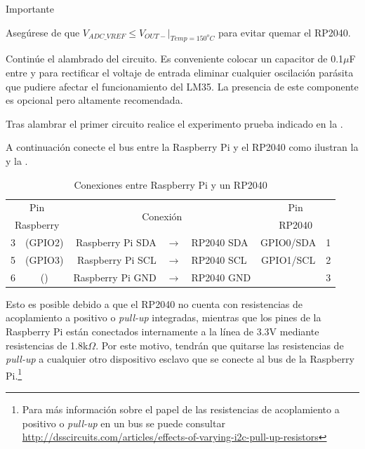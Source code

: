 \medskip
\begin{importantbox}{\large Importante}
	\begin{center}
		Asegúrese de que $V_{ADC\_VREF} \leq V_{OUT-}\Big|_{Temp=150^{o}C}$ para evitar quemar el RP2040.
	\end{center}
\end{importantbox}
\medskip

Continúe el alambrado del circuito.
Es conveniente colocar un capacitor de 0.1$\mu$F entre \VCC y \GND para rectificar el voltaje de entrada eliminar cualquier oscilación parásita que pudiere afectar el funcionamiento del LM35.
La presencia de este componente es opcional pero altamente recomendada.

\medskip
Tras alambrar el primer circuito realice el experimento prueba indicado en la .
\medskip


A continuación conecte el bus \IIC entre la Raspberry Pi y el RP2040 como ilustran la  y la .


\begin{table}
	\centering
	\caption{Conexiones \IIC entre Raspberry Pi y un RP2040}
	\label{tbl:pi-pico-i2c} %
	\begin{tabularx}{0.7\linewidth}{cc rcl cc}
	\toprule
	\multicolumn{2}{c}{   Pin   } & \multicolumn{3}{c}{\multirow{2}{*}{Conexión}} & \multicolumn{2}{c}{  Pin  } \\
	\multicolumn{2}{c}{Raspberry} & \multicolumn{3}{c}{}                          & \multicolumn{2}{c}{RP2040 } \\
	\midrule
	       3 & (GPIO2)            & Raspberry Pi SDA & $\rightarrow$ & RP2040 SDA & GPIO0/SDA       &     1     \\
	       5 & (GPIO3)            & Raspberry Pi SCL & $\rightarrow$ & RP2040 SCL & GPIO1/SCL       &     2     \\
	       6 & (\GND)             & Raspberry Pi GND & $\rightarrow$ & RP2040 GND & \GND            &     3     \\
	\bottomrule
	\end{tabularx}
\end{table}


Esto es posible debido a que el RP2040 no cuenta con resistencias de acoplamiento a positivo o \emph{pull-up} integradas, mientras que los pines \IIC de la Raspberry Pi están conectados internamente a la línea de 3.3V mediante resistencias de 1.8k$\Omega$.
Por este motivo, tendrán que quitarse las resistencias de \emph{pull-up} a cualquier otro dispositivo esclavo que se conecte al bus \IIC de la Raspberry Pi.\footnote{Para más información sobre el papel de las resistencias de acoplamiento a positivo o \emph{pull-up} en un bus \IIC se puede consultar \url{http://dsscircuits.com/articles/effects-of-varying-i2c-pull-up-resistors} }
